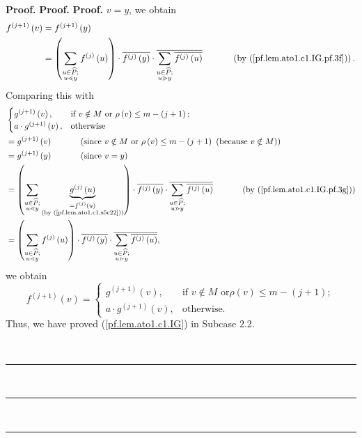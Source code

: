 \documentclass[numbers=enddot,12pt,final,onecolumn,notitlepage]{scrartcl}%
\theoremstyle{definition}
\newenvironment{verlong}{}{}
\newenvironment{proof}[1][Proof]{\noindent\textbf{#1.} }{\ \rule{0.5em}{0.5em}}
\let\sumnonlimits\sum
\renewcommand{\sum}{\sumnonlimits\limits}
\begin{document}
\begin{verlong}
\begin{proof}
\begin{proof}
\begin{proof}
$v=y$, we obtain%
\begin{align}
f^{\left(  j+1\right)  }\left(  v\right)   &  =f^{\left(  j+1\right)  }\left(
y\right) \nonumber\\
&  =\left(  \sum\limits_{\substack{u\in\widehat{P};\\u\lessdot y}}f^{\left(
j\right)  }\left(  u\right)  \right)  \cdot\overline{f^{\left(  j\right)
}\left(  y\right)  }\cdot\overline{\sum\limits_{\substack{u\in\widehat{P}%
;\\u\gtrdot y}}\overline{f^{\left(  j\right)  }\left(  u\right)  }%
}\ \ \ \ \ \ \ \ \ \ \left(  \text{by (\ref{pf.lem.ato1.c1.IG.pf.3f})}\right)
.\nonumber
\end{align}
Comparing this with%
\begin{align*}
&
\begin{cases}
g^{\left(  j+1\right)  }\left(  v\right)  , & \text{if }v\notin M\text{ or
}\rho\left(  v\right)  \leq m-\left(  j+1\right)  ;\\
a\cdot g^{\left(  j+1\right)  }\left(  v\right)  , & \text{otherwise}%
\end{cases}
\\
&  =g^{\left(  j+1\right)  }\left(  v\right)  \ \ \ \ \ \ \ \ \ \ \left(
\text{since }v\notin M\text{ or }\rho\left(  v\right)  \leq m-\left(
j+1\right)  \text{ (because }v\notin M\text{)}\right) \\
&  =g^{\left(  j+1\right)  }\left(  y\right)  \ \ \ \ \ \ \ \ \ \ \left(
\text{since }v=y\right) \\
&  =\left(  \sum\limits_{\substack{u\in\widehat{P};\\u\lessdot y}%
}\underbrace{g^{\left(  j\right)  }\left(  u\right)  }_{\substack{=f^{\left(
j\right)  }\left(  u\right)  \\\text{(by (\ref{pf.lem.ato1.c1.s5c22}))}%
}}\right)  \cdot\overline{f^{\left(  j\right)  }\left(  y\right)  }%
\cdot\overline{\sum\limits_{\substack{u\in\widehat{P};\\u\gtrdot y}%
}\overline{f^{\left(  j\right)  }\left(  u\right)  }}%
\ \ \ \ \ \ \ \ \ \ \left(  \text{by (\ref{pf.lem.ato1.c1.IG.pf.3g})}\right)
\\
&  =\left(  \sum\limits_{\substack{u\in\widehat{P};\\u\lessdot y}}f^{\left(
j\right)  }\left(  u\right)  \right)  \cdot\overline{f^{\left(  j\right)
}\left(  y\right)  }\cdot\overline{\sum\limits_{\substack{u\in\widehat{P}%
;\\u\gtrdot y}}\overline{f^{\left(  j\right)  }\left(  u\right)  }},
\end{align*}
we obtain%
\[
f^{\left(  j+1\right)  }\left(  v\right)  =%
\begin{cases}
g^{\left(  j+1\right)  }\left(  v\right)  , & \text{if }v\notin M\text{ or
}\rho\left(  v\right)  \leq m-\left(  j+1\right)  ;\\
a\cdot g^{\left(  j+1\right)  }\left(  v\right)  , & \text{otherwise.}%
\end{cases}
\]
Thus, we have proved (\ref{pf.lem.ato1.c1.IG}) in Subcase 2.2.


\end{proof}
\end{proof}
\end{proof}
\end{verlong}
\end{document}
